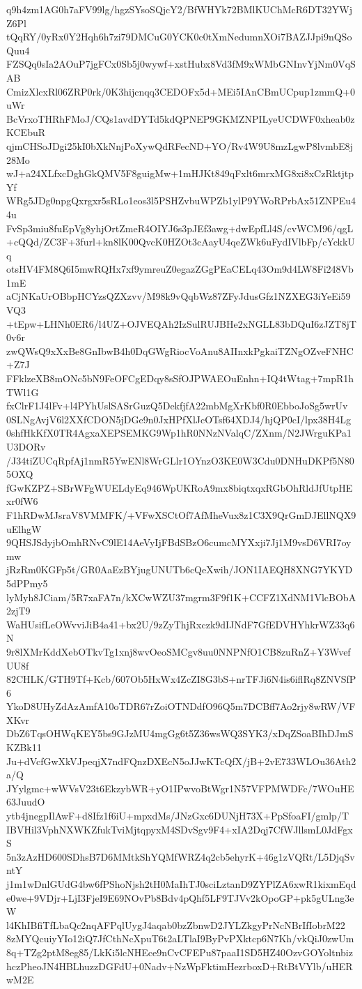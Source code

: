 q9h4zm1AG0h7aFV99lg/hgzSYsoSQjcY2/BfWHYk72BMlKUChMcR6DT32YWjZ6Pl
tQqRY/0yRx0Y2Hqh6h7zi79DMCuG0YCK0c0tXmNedumnXOi7BAZJJpi9nQSoQuu4
FZSQq0sIa2AOuP7jgFCx0Sb5j0wywf+xstHubx8Vd3fM9xWMbGNInvYjNm0VqSAB
CmizXlcxRl06ZRP0rk/0K3hijcnqq3CEDOFx5d+MEi5IAnCBmUCpup1zmmQ+0uWr
BcVrxoTHRhFMoJ/CQs1avdDYTd5kdQPNEP9GKMZNPILyeUCDWF0xheab0zKCEbuR
qjmCHSoJDgi25kI0bXkNnjPoXywQdRFecND+YO/Rv4W9U8mzLgwP8lvmbE8j28Mo
wJ+a24XLfxcDghGkQMV5F8guigMw+1mHJKt849qFxlt6mrxMG8xi8xCzRktjtpYf
WRg5JDg0npgQxrgxr5sRLo1eos3l5PSHZvbuWPZb1ylP9YWoRPrbAx51ZNPEu44u
FvSp3miu8fuEpVg8yhjOrtZmeR4OIYJ6s3pJEf3awg+dwEpfLl4S/cvWCM96/qgL
+cQQd/ZC3F+3furl+kn8lK00QvcK0HZOt3cAayU4qeZWk6uFydIVlbFp/cYckkUq
otsHV4FM8Q6I5mwRQHx7xf9ymreuZ0egazZGgPEaCELq43Om9d4LW8Fi248Vb1mE
aCjNKaUrOBbpHCYzsQZXzvv/M98k9vQqbWz87ZFyJdusGfz1NZXEG3iYeEi59VQ3
+tEpw+LHNh0ER6/l4UZ+OJVEQAh2IzSulRUJBHe2xNGLL83bDQuI6zJZT8jT0v6r
zwQWsQ9xXxBe8GnIbwB4h0DqGWgRiocVoAnu8AIInxkPgkaiTZNgOZveFNHC+Z7J
FFklzeXB8mONc5bN9FeOFCgEDqy8sSfOJPWAEOuEnhn+IQ4tWtag+7mpR1hTWl1G
fxClrF1J4lFv+l4PYhUslSASrGuzQ5DekfjfA22mbMgXrKbf0R0EbboJoSg5wrUv
0SLNgAvjV6l2XXfCDON5jDGe9n0JxHPfXlJcOTsf64XDJ4/hjQP0cI/lpx38H4Lg
0shfHkKfX0TR4AgxaXEPSEMKG9Wp1hR0NNzNValqC/ZXnm/N2JWrguKPa1U3DORv
/J34tiZUCqRpfAj1nmR5YwENl8WrGLlr1OYnzO3KE0W3Cdu0DNHuDKPf5N805OXQ
fGwKZPZ+SBrWFgWUELdyEq946WpUKRoA9mx8biqtxqxRGbOhRldJfUtpHExr0fW6
F1hRDwMJsraV8VMMFK/+VFwXSCtOf7AfMheVux8z1C3X9QrGmDJEllNQX9uElhgW
9QHSJSdyjbOmhRNvC9lE14AeVyIjFBdSBzO6cumcMYXxji7Jj1M9vsD6VRI7oymw
jRzRm0KGFp5t/GR0AaEzBYjugUNUTb6cQeXwih/JON1IAEQH8XNG7YKYD5dPPmy5
lyMyh8JCiam/5R7xaFA7n/kXCwWZU37mgrm3F9f1K+CCFZ1XdNM1VlcBObA2zjT9
WaHUsifLeOWvviJiB4a41+bx2U/9zZyThjRxczk9dIJNdF7GfEDVHYhkrWZ33q6N
9r8lXMrKddXebOTkvTg1xnj8wvOeoSMCgv8uu0NNPNfO1CB8zuRnZ+Y3WvefUU8f
82CHLK/GTH9Tf+Kcb/607Ob5HxWx4ZcZI8G3bS+nrTFJi6N4is6iflRq8ZNVSfP6
YkoD8UHyZdAzAmfA10oTDR67rZoiOTNDdfO96Q5m7DCBff7Ao2rjy8wRW/VFXKvr
DbZ6TqsOHWqKEY5bs9GJzMU4mgGg6t5Z36wsWQ3SYK3/xDqZSoaBIhDJmSKZBk11
Ju+dVcfGwXkVJpeqjX7ndFQnzDXEcN5oJJwKTcQfX/jB+2vE733WLOu36Ath2a/Q
JYylgmc+wWVsV23t6EkzybWR+yO1IPwvoBtWgr1N57VFPMWDFc/7WOuHE63JuudO
ytb4jnegpIlAwF+d8Ifz1f6iU+mpxdMs/JNzGxc6DUNjH73X+PpSfoaFI/gmlp/T
IBVHil3VphNXWKZfukTviMjtqpyxM4SDvSgv9F4+xIA2Dqj7CfWJllsmL0JdFgxS
5n3zAzHD600SDhsB7D6MMtkShYQMfWRZ4q2cb5ehyrK+46g1zVQRt/L5DjqSvntY
j1m1wDnlGUdG4bw6fPShoNjsh2tH0MaIhTJ0sciLztanD9ZYPlZA6xwR1kixmEqd
e0we+9VDjr+LjI3FjeI9E69NOvPb8Bdv4pQhf5LF9TJVv2kOpoGP+pk5gULng3eW
l4KhIBfiTfLbaQc2nqAFPqlUygJ4aqab0bzZbnwD2JYLZkgyPrNcNBrIfIobrM22
8zMYQcuiyYIo12iQ7JfCthNcXpuT6t2aLTlaI9ByPvPXktcp6N7Kh/vkQiJ0zwUm
8q+TZg2ptM8eg85/LkKi5lcNHEce9nCvCFEPu87paaI1SD5HZ40OzvGOYoltnbiz
hczPheoJN4HBLhuzzDGFdU+0Nadv+NzWpFktimHezrboxD+RtBtVYlb/uHERwM2E
